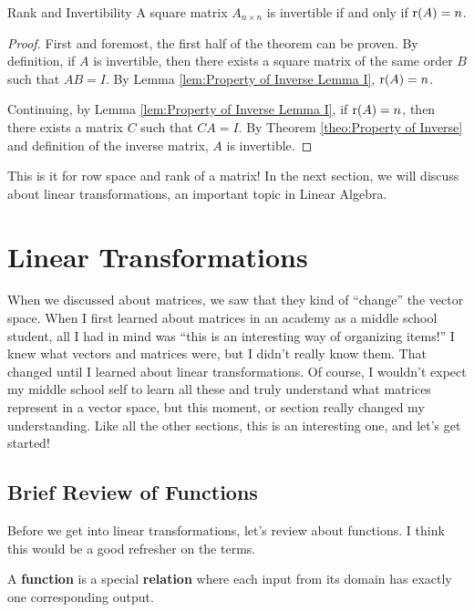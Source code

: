 \documentclass[../main.tex]{subfiles}
\begin{document}
\begin{theorem}{Rank and Invertibility}
A square matrix $A_{n \times n}$ is invertible if and only if
$\operatorname{r}(A) = n$.
\end{theorem}
\begin{proof}
First and foremost, the first half of the theorem can be proven.
By definition, if $A$ is invertible, then there exists a square matrix
of the same order $B$ such that $AB = I$. By Lemma \ref{lem:Property
of Inverse Lemma I}, $\operatorname{r}(A) = n$.

Continuing, by Lemma \ref{lem:Property of Inverse Lemma I}, if
$\operatorname{r}(A) = n$, then there exists a matrix $C$ such that $CA = I$.
By Theorem \ref{theo:Property of Inverse} and definition of the
inverse matrix, $A$ is invertible.
\end{proof}

This is it for row space and rank of a matrix! In the next section,
we will discuss about linear transformations, an important topic in
Linear Algebra.

\section{Linear Transformations}

When we discussed about matrices, we saw that they kind of ``change''
the vector space. When I first learned about matrices in an academy
as a middle school student, all I had in mind was ``this is an
interesting way of organizing items!'' I knew what vectors and
matrices were, but I didn't really know them. That changed until
I learned about linear transformations. Of course, I wouldn't expect
my middle school self to learn all these and truly understand what
matrices represent in a vector space, but this moment, or section
really changed my understanding. Like all the other sections, this
is an interesting one, and let's get started!

\subsection{Brief Review of Functions}

Before we get into linear transformations, let's review about
functions. I think this would be a good refresher on the terms.

\begin{definition}
A \textbf{function} is a special \textbf{relation} where each input
from its domain has exactly one corresponding output.
\end{definition}
\end{document}
